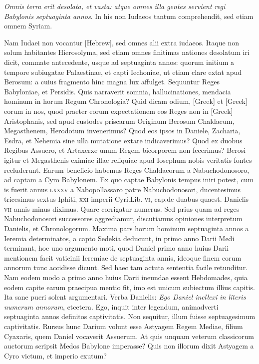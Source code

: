 \begin{parnumbers}
\textit{Omnis terra erit desolata, et vasta: atque omnes
illa gentes servient regi Babylonis septuaginta annos}.
\lnr{}In his non Iudaeos
tantum comprehendit, sed etiam omnem Syriam.

{}
\lnr{}Nam Iudaei
non vocantur \texthebrew{[Hebrew]}, sed omnes alii extra iudaeos.
\lnr{}Itaque non solum
habitantes Hierosolyma, sed etiam omnes finitimas nationes desolatum
iri dicit, commate antecedente, usque ad septuaginta annos:
quorum initium a tempore subiugatae Palaestinae, et capti Iechoniae,
ut etiam clare extat apud Berosum: a cuius fragmento hinc
magna lux affulget.
\lnr{}Sequuntur Reges Babyloniae, et Persidis.
\lnr{}Quis narraverit somnia, hallucinationes, mendacia hominum in horum
Regum Chronologia?
\lnr{}Quid dicam odium, \textgreek{[Greek]} et \textgreek{[Greek]}
eorum in nos, quod praeter eorum expectationem eos Reges non
in \textgreek{[Greek]} Aristophanis, sed apud custodes priscarum Originum
Berosum Chaldaeum, Megasthenem, Herodotum invenerimus?
\lnr{}Quod eos ipsos in Daniele, Zacharia, Esdra, et Nehemia sine
ulla mutatione extare indicaverimus?
\lnr{}Quod ex duobus Regibus
Assuero, et Artaxerxe unum Regem bicorporem non fecerimus?
\lnr{}Berosi igitur et Megasthenis eximiae illae reliquiae apud Iosephum
nobis veritatis fontes recluderunt.
\lnr{}Earum beneficio habemus Reges
Chaldaeorum a Nabuchodonosoro, ad captam a Cyro Babylonem.
\lnr{}Ex quo captae Babylonis tempus iniri potest, cum is fuerit annus
\textsc{lxxxv} a Nabopollassaro patre Nabuchodonosori, ducentesimus
tricesimus sextus Iphiti,
 \textsc{xxi} imperii Cyri.Lib. \textsc{vi}, cap.de duabus
quaest.
\lnr{}Danielis \textsc{vii} annis minus diximus.
\lnr{}Quare corrigatur
numerus.
\lnr{}Sed prius quam ad reges Nabuchodonosori successores aggrediamur,
discutiamus opiniones interpretum Danielis, et Chronologorum.
\lnr{}Maxima pars horum hominum septuaginta annos a
Ieremia determinatos, a capto Sedekia deducunt, in primo anno
Darii Medi terminant, hoc uno argumento moti, quod Daniel primo
anno huius Darii mentionem facit vaticinii Ieremiae de septuaginta
annis, ideoque finem eorum annorum tunc accidisse dicunt.
\lnr{}Sed haec tam actuta sententia facile retunditur.
\lnr{}Nam eodem modo
a primo anno huius Darii ineundae essent Hebdomades, quia eodem
capite earum praecipua mentio fit, imo est unicum subiectum illius
capitis.
\lnr{}Ita sane pueri solent argumentari.
\lnr{}Verba Danielis: \textit{Ego
Daniel inellexi in literis numerum annorum}, etcetera.
\lnr{}Ego, inquit inter
legendum, animadverti septuaginta annos definitos captivitatis.
\lnr{}Non sequitur, illum fuisse septuagesimum captivitatis.
\lnr{}Rursus hunc
Darium volunt esse Astyagem Regem Mediae, filium Cyaxaris,
quem Daniel vocaverit Assuerum.
\lnr{}At quis unquam veterum classicorum
auctorum scripsit Medos Babylone imperasse?
\lnr{}Quis non
illorum dixit Astyagem a Cyro victum, et imperio exutum?


\end{parnumbers}
